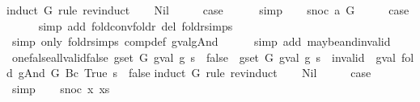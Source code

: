 \begin{isabellebody}
%
\isadelimproof
%
\endisadelimproof
%
\isatagproof
{}\isamarkupfalse%
{\isacharparenleft}induct\ G\ rule{\isacharcolon}\ rev{\isacharunderscore}induct{\isacharparenright}\isanewline
\ \ \isamarkupfalse%
\ Nil\isanewline
\ \ \isamarkupfalse%
\ \isamarkupfalse%
\ {\isacharquery}case\isanewline
\ \ \ \ \isamarkupfalse%
\ simp\isanewline
{}\isamarkupfalse%
\isanewline
\ \ \isamarkupfalse%
\ {\isacharparenleft}snoc\ a\ G{\isacharparenright}\isanewline
\ \ \isamarkupfalse%
\ \isamarkupfalse%
\ {\isacharquery}case\isanewline
\ \ \ \ \isamarkupfalse%
\ {\isacharparenleft}simp\ add{\isacharcolon}\ fold{\isacharunderscore}conv{\isacharunderscore}foldr\ del{\isacharcolon}\ foldr{\isachardot}simps{\isacharparenright}\isanewline
\ \ \ \ \isamarkupfalse%
\ {\isacharparenleft}simp\ only{\isacharcolon}\ foldr{\isachardot}simps\ comp{\isacharunderscore}def\ gval{\isacharunderscore}gAnd{\isacharparenright}\isanewline
\ \ \ \ \isamarkupfalse%
\ {\isacharparenleft}simp\ add{\isacharcolon}\ maybe{\isacharunderscore}and{\isacharunderscore}invalid{\isacharparenright}\isanewline
{}\isamarkupfalse%
%
\endisatagproof
{\isafoldproof}%
%
\isadelimproof
\isanewline
%
\endisadelimproof
\isanewline
{}\isamarkupfalse%
\ one{\isacharunderscore}false{\isacharunderscore}all{\isacharunderscore}valid{\isacharunderscore}false{\isacharcolon}\ {\isachardoublequoteopen}{\isasymexists}g{\isasymin}set\ G{\isachardot}\ gval\ g\ s\ {\isacharequal}\ false\ {\isasymLongrightarrow}\ {\isasymforall}g{\isasymin}set\ G{\isachardot}\ gval\ g\ s\ {\isasymnoteq}\ invalid\ {\isasymLongrightarrow}\ gval\ {\isacharparenleft}fold\ gAnd\ G\ {\isacharparenleft}Bc\ True{\isacharparenright}{\isacharparenright}\ s\ {\isacharequal}\ false{\isachardoublequoteclose}\isanewline
%
\isadelimproof
%
\endisadelimproof
%
\isatagproof
{}\isamarkupfalse%
{\isacharparenleft}induct\ G\ rule{\isacharcolon}\ rev{\isacharunderscore}induct{\isacharparenright}\isanewline
\ \ \isamarkupfalse%
\ Nil\isanewline
\ \ \isamarkupfalse%
\ \isamarkupfalse%
\ {\isacharquery}case\isanewline
\ \ \ \ \isamarkupfalse%
\ simp\isanewline
{}\isamarkupfalse%
\isanewline
\ \ \isamarkupfalse%
\ {\isacharparenleft}snoc\ x\ xs{\isacharparenright}\isanewline
\ \ \isamarkupfalse%
\ \isamarkupfalse%

\end{isabellebody}
